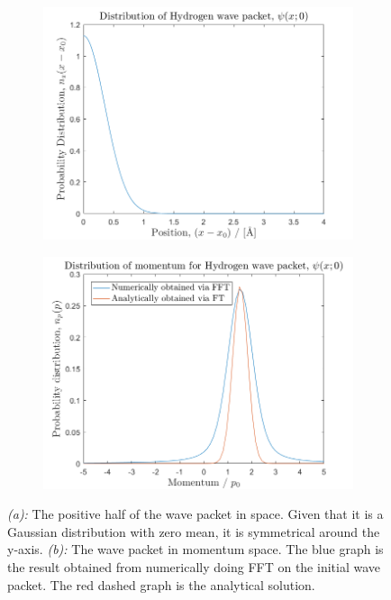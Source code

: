 \begin{figure}[H]
    \centering
    \captionsetup[subfigure]{justification=centering}
    \begin{subfigure}[b]{0.7\textwidth}
        \centering
        \includegraphics[width=\textwidth]{graphics/task1/position_prob.png}
		\caption{}
		\label{fig:1_a}
    \end{subfigure}
    \begin{subfigure}[b]{0.7\textwidth}
        \centering
        \includegraphics[width=\textwidth]{graphics/task1/momentum_prob.png}
        \caption{}
		\label{fig:1_b}
    \end{subfigure}
    \caption{\textit{(a):} The positive half of the wave packet in space. Given that it is a Gaussian distribution with zero mean, it is symmetrical around the y-axis. \textit{(b):} The wave packet in momentum space. The blue graph is the result obtained from numerically doing FFT on the initial wave packet. The red dashed graph is the analytical solution.}
    \label{fig:*}
\end{figure}

